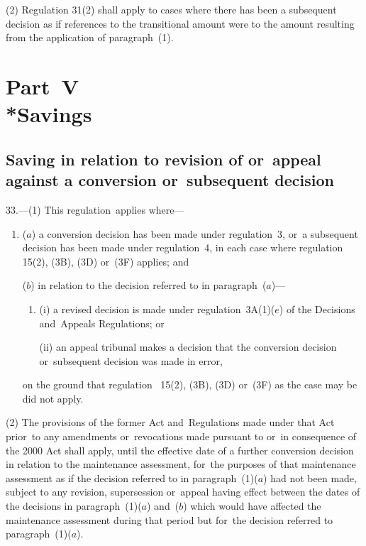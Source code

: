 \documentclass[12pt,a4paper]{article}
\begin{document}
(2) Regulation 31(2) shall apply to cases where there has been a subsequent decision as if references to the transitional amount were to the amount resulting from the application of paragraph~(1).

\section[Part~V --- Savings]{Part~V\\*Savings}

\renewcommand\parthead{--- Part~V}

\subsection[33. Saving in relation to revision of or~appeal against a conversion or~subsequent decision]{Saving in relation to revision of or~appeal against a conversion or~subsequent decision}

33.---(1)  This regulation~applies where—
\begin{enumerate}\item[]
($a$) a conversion decision has been made under regulation~3, or~a subsequent decision has been made under regulation~4, in each case where regulation~%
15(2), (3B), (3D) or~(3F)  %
applies; and

($b$) in relation to the decision referred to in paragraph~($a$)—
\begin{enumerate}\item[]
(i) a revised decision is made under regulation~3A(1)($e$)  of the Decisions and~Appeals Regulations; or

(ii) an appeal tribunal makes a decision that the conversion decision or~subsequent decision was made in error,
\end{enumerate}
on the ground that regulation~
15(2), (3B), (3D) or~(3F) as the case may be  %
did not apply.
\end{enumerate}

(2) The provisions of the former Act and~Regulations made under that Act prior~to any amendments or~revocations made pursuant to or~in consequence of the 2000 Act shall apply, until the effective date of a further conversion decision in relation to the maintenance assessment, for~the purposes of that maintenance assessment as if the decision referred to in paragraph~(1)($a$)  had not been made, subject to any revision, supersession or~appeal having effect between the dates of the decisions in paragraph~(1)($a$)  and~($b$)  which would have affected the maintenance assessment during that period but for~the decision referred to paragraph~(1)($a$). 
\end{document}
